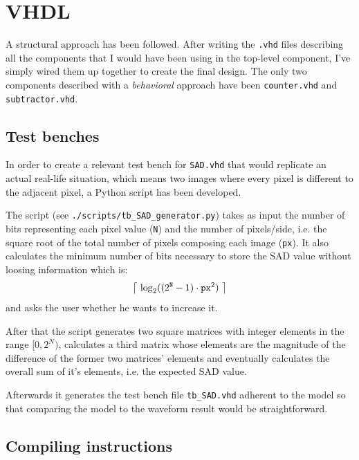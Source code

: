 \documentclass[12pt, a4paper]{article}
\DeclarePairedDelimiter\ceil{\lceil}{\rceil}
\begin{document}
\section{VHDL}

A structural approach has been followed.
After writing the \texttt{.vhd} files describing all the components that I would have been using in the top-level component, I've simply wired them up together to create the final design.
The only two components described with a \textit{behavioral} approach have been \texttt{counter.vhd} and \texttt{subtractor.vhd}.



\subsection{Test benches}



In order to create a relevant test bench for \texttt{SAD.vhd} that would replicate an actual real-life situation, which means two images where every pixel is different to the adjacent pixel, a Python script has been developed.
\newline

The script (see \texttt{./scripts/tb\_SAD\_generator.py}) takes as input the number of bits representing each pixel value (\texttt{N}) and the number of pixels/side, i.e. the square root of the total number of pixels composing each image (\texttt{px}).
It also calculates the minimum number of bits necessary to store the SAD value without loosing information which is:
\begin{equation}
    \ceil[\big]{\ \log_2( (2^\texttt{N}-1) \cdot \texttt{px}^2 )\ } 
\end{equation}
and asks the user whether he wants to increase it.
\newline

After that the script generates two square matrices with integer elements in the range $[0, 2^N)$, calculates a third matrix whose elements are the magnitude of the difference of the former two matrices' elements and eventually calculates the overall sum of it's elements, i.e. the expected SAD value.
\newline


Afterwards it generates the test bench file \texttt{tb\_SAD.vhd} adherent to the model so that comparing the model to the waveform result would be straightforward.

\newpage
\subsection{Compiling instructions}
\end{document}
